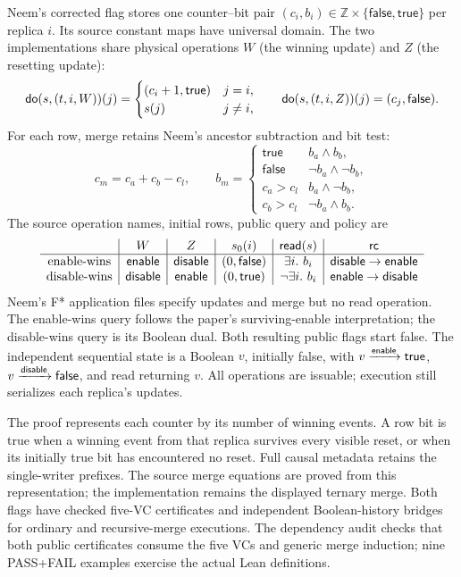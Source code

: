 \begin{example}\label{ex:neem-flags}
Neem's corrected flag stores one counter--bit pair $(c_i,b_i)\in\mathbb Z\times
\{\mathsf{false},\mathsf{true}\}$ per replica $i$. Its source constant maps
have universal domain. The two implementations share physical operations
$W$ (the winning update) and $Z$ (the resetting update):
\[
 \mathsf{do}(s,(t,i,W))(j)=
 \begin{cases}(c_i+1,\mathsf{true})&j=i,\\s(j)&j\ne i,\end{cases}
 \qquad
 \mathsf{do}(s,(t,i,Z))(j)=(c_j,\mathsf{false}).
\]
For each row, merge retains Neem's ancestor subtraction and bit test:
\[
 c_m=c_a+c_b-c_l,\qquad
 b_m=\begin{cases}
 \mathsf{true}&b_a\land b_b,\\
 \mathsf{false}&\neg b_a\land\neg b_b,\\
 c_a>c_l&b_a\land\neg b_b,\\
 c_b>c_l&\neg b_a\land b_b.
 \end{cases}
\]
The source operation names, initial rows, public query and policy are
\[
\begin{array}{c|c|c|c|c|c}
 &W&Z&s_0(i)&\mathsf{read}(s)&\mathsf{rc}\\\hline
 \text{enable-wins}&\mathsf{enable}&\mathsf{disable}&(0,\mathsf{false})&
   \exists i.\ b_i&\mathsf{disable}\to\mathsf{enable}\\
 \text{disable-wins}&\mathsf{disable}&\mathsf{enable}&(0,\mathsf{true})&
   \neg\exists i.\ b_i&\mathsf{enable}\to\mathsf{disable}
\end{array}
\]
Neem's F* application files specify updates and merge but no read operation.
The enable-wins query follows the paper's surviving-enable interpretation;
the disable-wins query is its Boolean dual. Both resulting public flags start
false. The independent sequential state is a Boolean $v$, initially false,
with $v\xrightarrow{\mathsf{enable}}\mathsf{true}$,
$v\xrightarrow{\mathsf{disable}}\mathsf{false}$, and read returning $v$.
All operations are issuable; execution still serializes each replica's updates.

The proof represents each counter by its number of winning events. A row bit
is true when a winning event from that replica survives every visible reset,
or when its initially true bit has encountered no reset. Full causal metadata
retains the single-writer prefixes. The source merge equations are proved from
this representation; the implementation remains the displayed ternary merge.
Both flags have checked five-VC certificates and independent Boolean-history
bridges for ordinary and recursive-merge executions. The dependency audit
checks that both public certificates consume the five VCs and generic merge
induction; nine PASS+FAIL examples exercise the actual Lean definitions.
\end{example}
